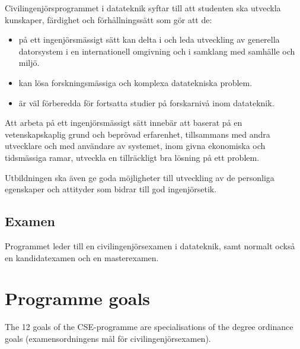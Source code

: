 \documentclass[twocolumn]{article}
\begin{document}
Civilingenjörsprogrammet i datateknik syftar till att studenten ska
utveckla kunskaper, färdighet och förhållningssätt som gör att de:
\begin{itemize}
\item på ett ingenjörsmässigt sätt kan delta i och leda utveckling av
  generella datorsystem i en internationell omgivning och i samklang
  med samhälle och miljö.
\item kan lösa forskningsmässiga och komplexa datatekniska problem.
\item är väl förberedda för fortsatta studier på forskarnivå inom
  datateknik.
\end{itemize}
Att arbeta på ett ingenjörsmässigt sätt innebär att
baserat på en vetenskapskaplig grund och beprövad erfarenhet,
tillsammans med andra utvecklare och med användare av systemet,
inom givna ekonomiska och tidsmässiga ramar,
utveckla en tillräckligt bra lösning på ett problem.

Utbildningen ska även ge goda möjligheter till utveckling av de
personliga egenskaper och attityder som bidrar till god ingenjörsetik.

\subsection{Examen}

Programmet leder till en civilingenjörsexamen i datateknik, samt
normalt också en kandidat\-examen och en masterexamen.

\section{Programme goals}

The 12 goals of the CSE-programme are specialisations of the degree
ordinance goals (examensordningens mål för civilingenjörsexamen).
\end{document}
